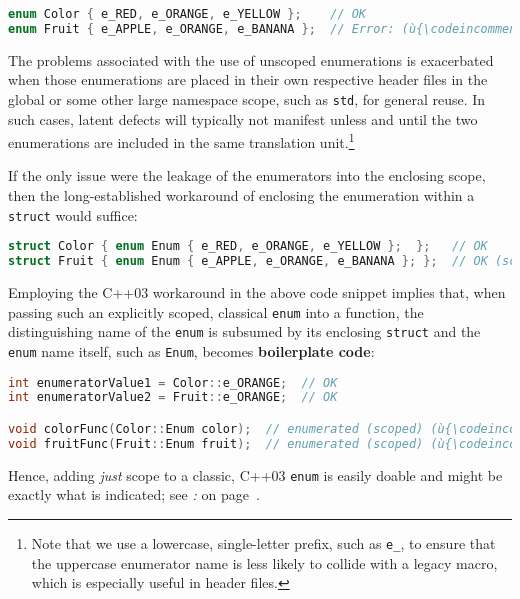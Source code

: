 \begin{lstlisting}[language=C++]
enum Color { e_RED, e_ORANGE, e_YELLOW };    // OK
enum Fruit { e_APPLE, e_ORANGE, e_BANANA };  // Error: (ù{\codeincomments{e\_ORANGE}}ù) is redefined.
\end{lstlisting}

\noindent The problems associated with the use of unscoped enumerations is
exacerbated when those enumerations are placed in their own respective
header files in the global or some other large namespace scope, such as
\texttt{std}, for general reuse. In such cases, latent defects will
typically not manifest unless and until the two enumerations are
included in the same translation unit.{\cprotect\footnote{Note that
we use a lowercase, single-letter prefix, such as \texttt{e\_}, to
ensure that the uppercase enumerator name is less likely to collide
with a legacy macro, which is especially useful in header files.}}

If the only issue were the leakage of the enumerators into the enclosing
scope, then the long-established workaround of enclosing the enumeration
within a \texttt{struct} would suffice:

\begin{lstlisting}[language=C++]
struct Color { enum Enum { e_RED, e_ORANGE, e_YELLOW };  };   // OK
struct Fruit { enum Enum { e_APPLE, e_ORANGE, e_BANANA }; };  // OK (scoped)
\end{lstlisting}

\noindent Employing the C++03 workaround in the above code snippet implies that,
when passing such an explicitly scoped, classical \texttt{enum} into a
function, the distinguishing name of the \texttt{enum} is subsumed by
its enclosing \texttt{struct} and the \texttt{enum} name itself, such as
\texttt{Enum}, becomes \textbf{boilerplate code}:

\begin{lstlisting}[language=C++]
int enumeratorValue1 = Color::e_ORANGE;  // OK
int enumeratorValue2 = Fruit::e_ORANGE;  // OK

void colorFunc(Color::Enum color);  // enumerated (scoped) (ù{\codeincomments{Color}}ù) parameter
void fruitFunc(Fruit::Enum fruit);  // enumerated (scoped) (ù{\codeincomments{Fruit}}ù) parameter
\end{lstlisting}

\noindent Hence, adding \emph{just} scope to a classic, C++03 \texttt{enum} is
easily doable and might be exactly what is indicated; see
\textit{: } on page~\pageref{strong-typing-of-an-enum-class-can-be-counterproductive}.

